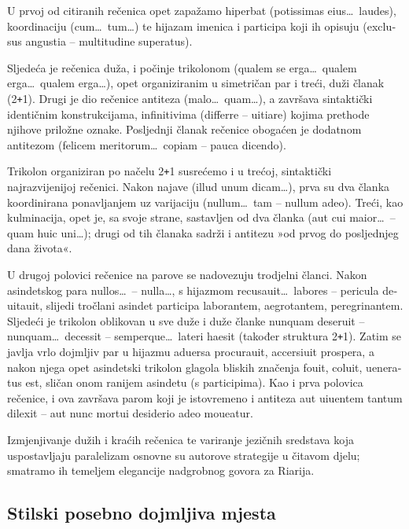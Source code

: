 \documentclass[a5paper,twoside]{article}
\begin{document}
U prvoj od citiranih rečenica opet zapažamo hiperbat \textlatin{(potissimas eius\dots\ laudes)}, koordinaciju \textlatin{(cum\dots\ tum\dots)} te hijazam imenica i participa koji ih opisuju \textlatin{(exclusus angustia – multitudine superatus).}

Sljedeća je rečenica duža, i počinje trikolonom \textlatin{(qualem se erga\dots\ qualem erga\dots\ qualem erga\dots),} opet organiziranim u simetričan par i treći, duži članak (2{}\verb!+!1). Drugi je dio rečenice antiteza \textlatin{(malo\dots\ quam\dots)}, a završava sintaktički identičnim konstrukcijama, infinitivima \textlatin{(differre – uitiare)} kojima prethode njihove priložne oznake. Posljednji članak rečenice obogaćen je dodatnom antitezom \textlatin{(felicem meritorum\dots\ copiam – pauca dicendo).}

Trikolon organiziran po načelu 2{}\verb!+!1 susrećemo i u trećoj, sintaktički najrazvijenijoj rečenici. Nakon najave \textlatin{(illud unum dicam\dots),} prva su dva članka koordinirana ponavljanjem uz varijaciju \textlatin{(nullum\dots\ tam – nullum adeo).} Treći, kao kulminacija, opet je, sa svoje strane, sastavljen od dva članka \textlatin{(aut cui maior\dots\ – quam huic uni\dots);} drugi od tih članaka sadrži i antitezu »od prvog do posljednjeg dana života«. 

U drugoj polovici rečenice na parove se nadovezuju trodjelni članci. Nakon asindetskog para \textlatin{nullos\dots\ – nulla\dots,} s hijazmom \textlatin{recusauit\dots\ labores – pericula deuitauit,} slijedi tročlani asindet participa \textlatin{laborantem, aegrotantem, peregrinantem.} Sljedeći je trikolon oblikovan u sve duže i duže članke \textlatin{nunquam deseruit – nunquam\dots\ decessit – semperque\dots\ lateri haesit} (također struktura 2{}\verb!+!1). Zatim se javlja vrlo dojmljiv par u hijazmu \textlatin{aduersa procurauit, accersiuit prospera,} a nakon njega opet asindetski trikolon glagola bliskih značenja \textlatin{fouit, coluit, ueneratus est,} sličan onom ranijem asindetu (s participima). Kao i prva polovica rečenice, i ova završava parom koji je istovremeno i antiteza \textlatin{aut uiuentem tantum dilexit – aut nunc mortui desiderio adeo moueatur.}

Izmjenjivanje dužih i kraćih rečenica te variranje jezičnih sredstava koja uspostavljaju paralelizam osnovne su autorove strategije u čitavom djelu; smatramo ih temeljem elegancije nadgrobnog govora za Riarija.

\subsection{Stilski posebno dojmljiva mjesta}
\end{document}
